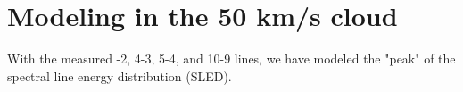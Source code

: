 \section{Modeling \cyano in the 50 km/s cloud}

With the measured -2, 4-3, 5-4, and 10-9 lines, we have modeled the "peak" of the \cyano spectral line energy distribution (SLED).